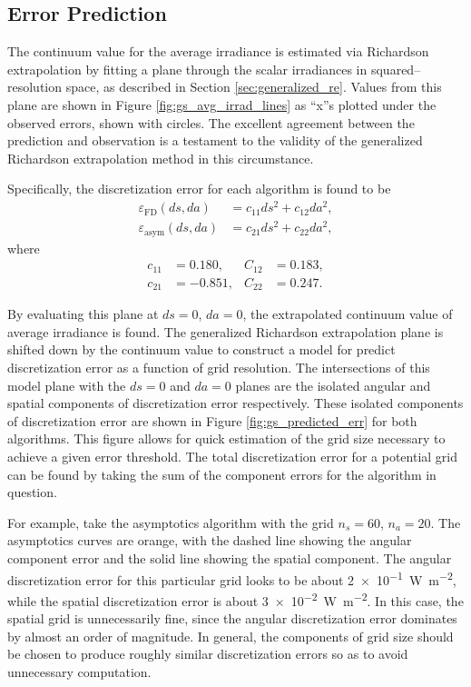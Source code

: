 \subsection{Error Prediction}
The continuum value for the average irradiance is estimated via Richardson extrapolation by fitting a plane through the scalar irradiances in squared--resolution space, as described in Section \ref{sec:generalized_re}.
Values from this plane are shown in Figure \ref{fig:gs_avg_irrad_lines} as ``x''s plotted under the observed errors, shown with circles.
The excellent agreement between the prediction and observation is a testament to the validity of the generalized Richardson extrapolation method in this circumstance.

Specifically, the discretization error for each algorithm is found to be
\begin{align}
  \varepsilon_{\mbox{FD}}(ds, da) &= c_{11} ds^2 + c_{12} da^2, \\
  \varepsilon_{\mbox{asym}}(ds, da) &= c_{21} ds^2 + c_{22} da^2,
\end{align}
where
\begin{align}
  c_{11} &= 0.180, & C_{12} &= 0.183, \\
  c_{21} &= -0.851, & C_{22} &= 0.247.
\end{align}

By evaluating this plane at $ds=0$, $da=0$, the extrapolated continuum value of average irradiance is found.
The generalized Richardson extrapolation plane is shifted down by the continuum value to construct a model for predict discretization error as a function of grid resolution.
The intersections of this model plane with the $ds=0$ and $da=0$ planes are the isolated angular and spatial components of discretization error respectively.
These isolated components of discretization error are shown in Figure \ref{fig:gs_predicted_err} for both algorithms.
This figure allows for quick estimation of the grid size necessary to achieve a given error threshold.
The total discretization error for a potential grid can be found by taking the sum of the component errors for the algorithm in question.

For example, take the asymptotics algorithm with the grid $n_s=60$, $n_a=20$.
The asymptotics curves are orange, with the dashed line showing the angular component error and the solid line showing the spatial component.
The angular discretization error for this particular grid looks to be about \SI{2e-1}{\W\per\m\squared}, while the spatial discretization error is about \SI{3e-2}{\W\per\m\squared}.
In this case, the spatial grid is unnecessarily fine, since the angular discretization error dominates by almost an order of magnitude.
In general, the components of grid size should be chosen to produce roughly similar discretization errors so as to avoid unnecessary computation.

